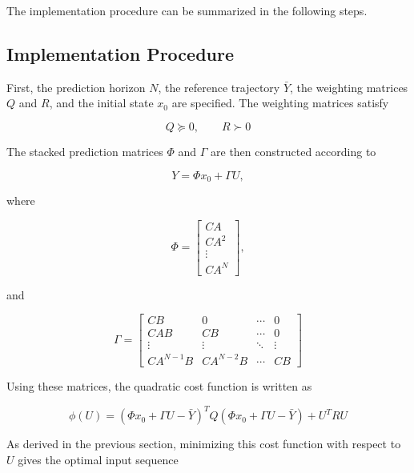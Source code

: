 The implementation procedure can be summarized in the following steps.

\subsection{Implementation Procedure}

First, the prediction horizon \(N\), the reference trajectory \(\bar{Y}\), the weighting matrices \(Q\) and \(R\), and the initial state \(x_0\) are specified. The weighting matrices satisfy

\begin{equation}
    Q \succeq 0,
    \qquad
    R \succ 0
\end{equation}

The stacked prediction matrices \(\Phi\) and \(\Gamma\) are then constructed according to

\begin{equation}
    Y = \Phi x_0 + \Gamma U,
\end{equation}

where

\begin{equation}
    \Phi =
    \begin{bmatrix}
        CA \\
        CA^2 \\
        \vdots \\
        CA^N
    \end{bmatrix},
\end{equation}

and

\begin{equation}
    \Gamma =
    \begin{bmatrix}
        CB & 0 & \cdots & 0 \\
        CAB & CB & \cdots & 0 \\
        \vdots & \vdots & \ddots & \vdots \\
        CA^{N-1}B & CA^{N-2}B & \cdots & CB
    \end{bmatrix}
\end{equation}

Using these matrices, the quadratic cost function is written as

\begin{equation}
    \phi(U)
    =
    (\Phi x_0+\Gamma U-\bar{Y})^T
    Q
    (\Phi x_0+\Gamma U-\bar{Y})
    +
    U^T R U
\end{equation}

As derived in the previous section, minimizing this cost function with respect to \(U\) gives the optimal input sequence

